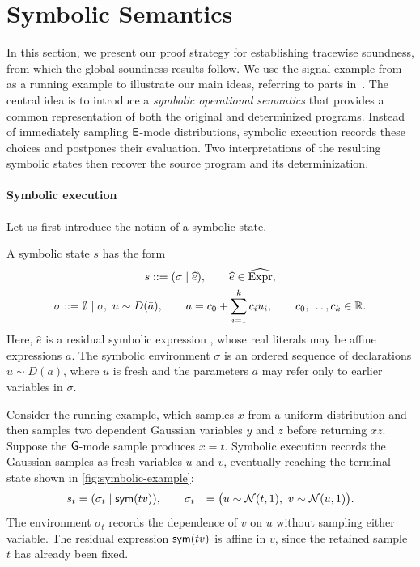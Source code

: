 \section{Symbolic Semantics}
\label{sec:symbolic-semantics}

In this section, we present our proof strategy for establishing tracewise soundness, from which the global soundness results follow. We use the signal example from  as a running example to illustrate our main ideas, referring to parts in~. The central idea is to introduce a \emph{symbolic operational semantics} that provides a common representation of both the original and determinized programs. Instead of immediately sampling $\mathsf{E}$-mode
distributions, symbolic execution records these choices and postpones their evaluation. Two interpretations of the resulting symbolic states then recover the source program and its determinization. 



\paragraph{Symbolic execution}
Let us first introduce the notion of a symbolic state.

\begin{definition}
A symbolic state $s$ has the form
\[
\begin{gathered}
  s ::=(\sigma\mid\widehat e),
  \qquad \widehat e\in\widehat{\mathrm{Expr}},\\
  \sigma ::=\emptyset\mid\sigma,\ u\sim D(\bar a),
  \qquad a=c_0+\sum_{i=1}^{k}c_i u_i,
  \qquad c_0,\ldots,c_k\in\mathbb{R}.
\end{gathered}
\]
Here, $\widehat e$ is a residual symbolic expression
, whose real literals may
be affine expressions $a$.
The symbolic environment $\sigma$
is an ordered sequence of declarations
$u\sim D(\bar a)$, where $u$ is fresh and the
parameters $\bar a$ may refer only to earlier
variables in $\sigma$.
\end{definition}

Consider the running example, which
samples $x$ from a uniform distribution and then
samples two dependent Gaussian variables $y$ and $z$
before returning $xz$.
Suppose the $\mathsf{G}$-mode sample produces $x=t$.
Symbolic execution records the Gaussian samples as
fresh variables $u$ and $v$, eventually reaching the terminal state shown in \cref{fig:symbolic-example}:
\[
\begin{aligned}
  s_t &= (\sigma_t\mid\mathsf{sym}(tv)), \qquad
  \sigma_t &=
  \bigl(u\sim\mathcal N(t,1),\
        v\sim\mathcal N(u,1)\bigr).
\end{aligned}
\]
The environment $\sigma_t$ records the dependence of $v$ on $u$
without sampling either variable. The residual
expression $\mathsf{sym}(tv)$ is affine in $v$, since the
retained sample $t$ has already been fixed.

